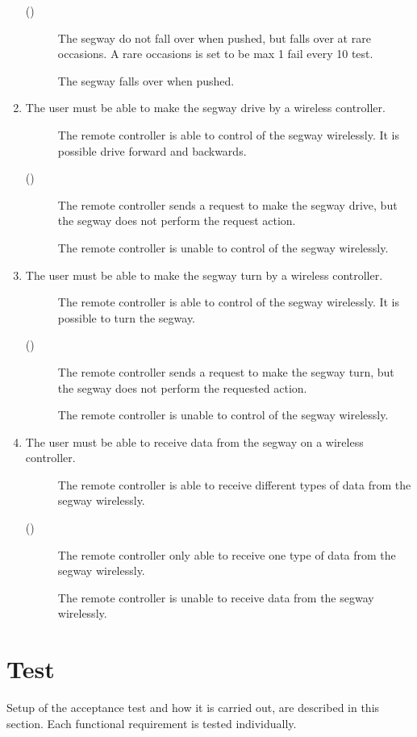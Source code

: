 \begin{enumerate}
\begin{description}
	\item[()]The segway do not fall over when pushed, but falls over at rare occasions. A rare occasions is set to be max 1 fail every 10 test.
	\item[  \phantom{)}]The segway falls over when pushed.
	\end{description}
\item The user must be able to make the segway drive by a wireless controller.
	\begin{description}
	\item[  ]The remote controller is able to control of the segway wirelessly. It is possible drive forward and backwards.
	\item[()]The remote controller sends a request to make the segway drive, but the segway does not perform the request action.
	\item[  \phantom{)}]The remote controller is unable to control of the segway wirelessly.
	\end{description}
\item The user must be able to make the segway turn by a wireless controller.
	\begin{description}
	\item[  ]The remote controller is able to control of the segway wirelessly. It is possible to turn the segway.
	\item[()]The remote controller sends a request to make the segway turn, but the segway does not perform the requested action.
	\item[  \phantom{)}]The remote controller is unable to control of the segway wirelessly.
	\end{description}
\item The user must be able to receive data from the segway on a wireless controller.
	\begin{description}
	\item[  ]The remote controller is able to receive different types of data from the segway wirelessly.
	\item[()]The remote controller only able to receive one type of data from the segway wirelessly.
	\item[  \phantom{)}]The remote controller is unable to receive data from the segway wirelessly.
	\end{description}
\end{enumerate} 

\section{Test}
Setup of the acceptance test and how it is carried out, are described in this section. Each functional requirement is tested individually.
